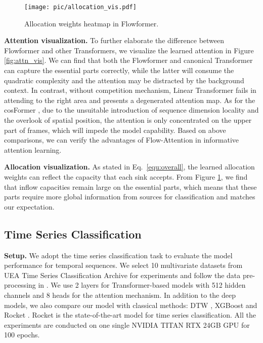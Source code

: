 \documentclass[nohyperref]{article}
\theoremstyle{plain}
\theoremstyle{definition}
\theoremstyle{remark}
\begin{document}
\begin{figure}[h]
    \begin{center}
    \centerline{\texttt{[image: pic/allocation\_vis.pdf]}}
    \vspace{-5pt}
    \caption{Allocation weights  heatmap in Flowformer.}
    \label{fig:allocation_vis}
    \end{center}
    \vspace{-10pt}
\end{figure}

\textbf{Attention visualization.} To further elaborate the difference between Flowformer and other Transformers, we visualize the learned attention in Figure \ref{fig:attn_vis}. We can find that both the Flowformer and canonical Transformer \cite{NIPS2017_3f5ee243} can capture the essential parts correctly, while the latter will consume the quadratic complexity and the attention may be distracted by the background context. In contrast, without competition mechanism, Linear Transformer \cite{Katharopoulos2020TransformersAR} fails in attending to the right area and presents a degenerated attention map. As for the cosFormer \cite{anonymous2022cosformer}, due to the unsuitable introduction of sequence dimension locality and the overlook of spatial position, the attention is only concentrated on the upper part of frames, which will impede the model capability. Based on above comparisons, we can verify the advantages of Flow-Attention in informative attention learning.

\textbf{Allocation visualization.} As stated in Eq.~\eqref{equ:overall}, the learned allocation weights can reflect the capacity that each sink accepts. From Figure \ref{fig:allocation_vis}, we find that inflow capacities remain large on the essential parts, which means that these parts require more global information from sources for classification and matches our expectation.


\subsection{Time Series Classification}

\textbf{Setup.} We adopt the time series classification task to evaluate the model performance for temporal sequences. We select 10 multivariate datasets from UEA Time Series Classification Archive \cite{Bagnall2018TheUM} for experiments and follow the data pre-processing in \cite{Zerveas2021ATF}. We use 2 layers for Transformer-based models with 512 hidden channels and 8 heads for the attention mechanism. In addition to the deep models, we also compare our model with classical methods: DTW \cite{Berndt1994UsingDT}, XGBoost \cite{Chen2016XGBoostAS} and Rocket \cite{Dempster2020ROCKETEF}. Rocket is the state-of-the-art model for time series classification. All the experiments are conducted on one single NVIDIA TITAN RTX 24GB GPU for 100 epochs.
\end{document}
